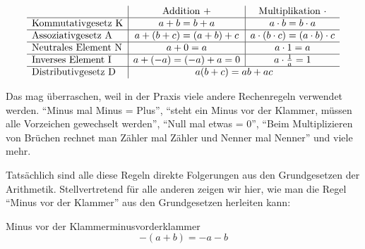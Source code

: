 \[
    \begin{array}{l|c|c}
         & \text{Addition } +                 & \text{Multiplikation } \cdot \\ \hline
        \text{Kommutativgesetz K}
         & a+b=b+a
         & a\cdot b=b\cdot a                                                 \\ \hline
        \text{Assoziativgesetz A}
         & a+(b+c)=(a+b)+c
         & a\cdot(b\cdot c)=(a\cdot b)\cdot c                                \\ \hline
        \text{Neutrales Element N}
         & a+0=a
         & a\cdot1=a                                                         \\ \hline
        \text{Inverses Element I}
         & a+(-a)=(-a)+a=0
         & a\cdot\frac{1}{a}=1                                               \\ \hline
        \text{Distributivgesetz D}
         & \multicolumn{2}{c}{a(b+c)=ab+ac}
    \end{array}
\]

Das mag überraschen, weil in der Praxis viele andere Rechenregeln verwendet werden. \enquote{Minus mal Minus = Plus}, \enquote{steht ein Minus vor der Klammer, müssen alle Vorzeichen gewechselt werden}, \enquote{Null mal etwas = 0}, \enquote{Beim Multiplizieren von Brüchen rechnet man Zähler mal Zähler und Nenner mal Nenner} und viele mehr.

Tatsächlich sind alle diese Regeln direkte Folgerungen aus den Grundgesetzen der Arithmetik. Stellvertretend für alle anderen zeigen wir hier, wie man die Regel \enquote{Minus vor der Klammer} aus den Grundgesetzen herleiten kann:

\begin{satz}{Minus vor der Klammer}{minusvorderklammer}
    \[
        -(a+b)=-a-b
    \]
\end{satz}

